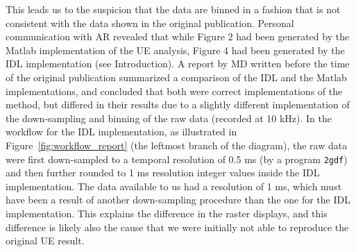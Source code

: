 \documentclass[10pt,a4paper,onecolumn]{article}
\begin{document}
This leads us to the suspicion that the data are binned in a fashion
that is not consistent with the data shown in the original publication.
Personal communication with AR revealed that while Figure 2 had been
generated by the Matlab implementation of the UE analysis, Figure 4 had
been generated by the IDL implementation (see Introduction). A report by
MD written before the time of the original publication summarized a
comparison of the IDL and the Matlab implementations, and concluded that
both were correct implementations of the method, but differed in their
results due to a slightly different implementation of the down-sampling
and binning of the raw data (recorded at 10 kHz). In the workflow for
the IDL implementation, as illustrated in
Figure~\ref{fig:workflow_report} (the leftmost branch of the diagram),
the raw data were first down-sampled to a temporal resolution of 0.5 ms
(by a program \texttt{2gdf}) and then further rounded to 1 ms resolution
integer values inside the IDL implementation. The data available to us
had a resolution of 1 ms, which must have been a result of another
down-sampling procedure than the one for the IDL implementation. This
explains the difference in the raster displays, and this difference is
likely also the cause that we were initially not able to reproduce the
original UE result.
\end{document}
